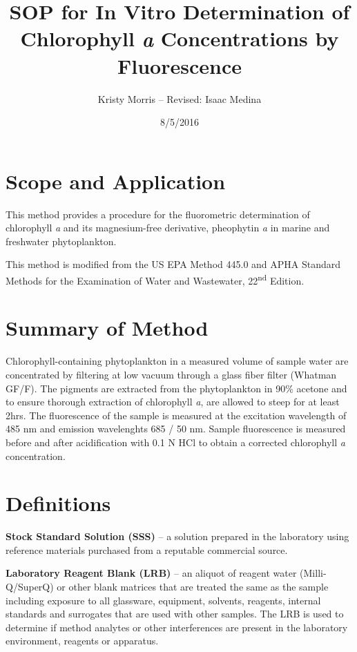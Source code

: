 \documentclass[12pt]{../SOP3_alpha}
\author{Kristy Morris -- Revised: Isaac Medina}
\title{SOP for In Vitro Determination of Chlorophyll \textit{a} Concentrations by Fluorescence}
\date{8/5/2016}
\begin{document}


\maketitle

\section{Scope and Application}

\NP This method provides a procedure for the fluorometric determination of chlorophyll \textit{a} and its magnesium-free derivative, pheophytin \textit{a} in marine and freshwater phytoplankton.

\NP This method is modified from the US EPA Method 445.0 and APHA Standard Methods for the Examination of Water and Wastewater, 22\textsuperscript{nd} Edition. 


\section{Summary of Method}

\NP Chlorophyll-containing phytoplankton in a measured volume of sample water are concentrated by filtering at low vacuum through a glass fiber filter (Whatman GF/F). The pigments are extracted from the phytoplankton in 90\% acetone and to ensure thorough extraction of chlorophyll \textit{a}, are allowed to steep for at least 2hrs. The fluorescence of the sample is measured at the excitation wavelength of 485 nm and emission wavelenghts 685 / 50 nm. Sample fluorescence is measured before and after acidification with 0.1 N HCl to obtain a corrected chlorophyll \textit{a} concentration. 


\section{Definitions}
\NP \textbf{Stock Standard Solution (SSS)} -- a solution prepared in the laboratory using reference materials purchased from a reputable commercial source.

\NP \textbf{Laboratory Reagent Blank (LRB)} -- an aliquot of reagent water (Milli-Q/SuperQ) or other blank matrices that are treated the same as the sample including exposure to all glassware, equipment, solvents, reagents, internal standards and surrogates that are used with other samples. The LRB is used to determine if method analytes or other interferences are present in the laboratory environment, reagents or apparatus. 
\end{document}
